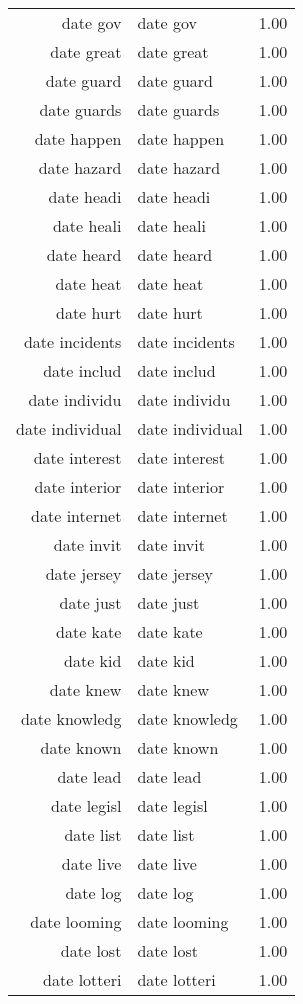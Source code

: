 \begin{table}[ht]
\begin{tabular}{rlr}
  date gov & date gov & 1.00 \\ 
  date great & date great & 1.00 \\ 
  date guard & date guard & 1.00 \\ 
  date guards & date guards & 1.00 \\ 
  date happen & date happen & 1.00 \\ 
  date hazard & date hazard & 1.00 \\ 
  date headi & date headi & 1.00 \\ 
  date heali & date heali & 1.00 \\ 
  date heard & date heard & 1.00 \\ 
  date heat & date heat & 1.00 \\ 
  date hurt & date hurt & 1.00 \\ 
  date incidents & date incidents & 1.00 \\ 
  date includ & date includ & 1.00 \\ 
  date individu & date individu & 1.00 \\ 
  date individual & date individual & 1.00 \\ 
  date interest & date interest & 1.00 \\ 
  date interior & date interior & 1.00 \\ 
  date internet & date internet & 1.00 \\ 
  date invit & date invit & 1.00 \\ 
  date jersey & date jersey & 1.00 \\ 
  date just & date just & 1.00 \\ 
  date kate & date kate & 1.00 \\ 
  date kid & date kid & 1.00 \\ 
  date knew & date knew & 1.00 \\ 
  date knowledg & date knowledg & 1.00 \\ 
  date known & date known & 1.00 \\ 
  date lead & date lead & 1.00 \\ 
  date legisl & date legisl & 1.00 \\ 
  date list & date list & 1.00 \\ 
  date live & date live & 1.00 \\ 
  date log & date log & 1.00 \\ 
  date looming & date looming & 1.00 \\ 
  date lost & date lost & 1.00 \\ 
  date lotteri & date lotteri & 1.00 \\ 

\end{tabular}
\end{table}
